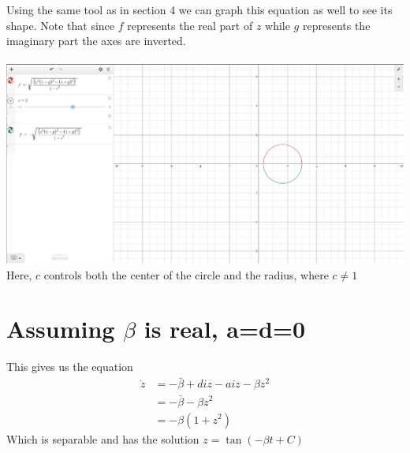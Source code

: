 \documentclass[10pt]{article}
\begin{document}
Using the same tool as in section 4 we can graph this equation as well to see its shape. Note that since $f$ represents the real part of $z$ while $g$ represents the imaginary part the axes are inverted.\\\\
\includegraphics[width=\textwidth]{Figure3}\\
Here, $c$ controls both the center of the circle and the radius, where $c\neq1$



\section{Assuming $\beta$ is real, a=d=0}
This gives us the equation
\begin{align*}
\dot z&=-\bar\beta+diz-aiz-\beta z^2\\
&=-\bar\beta-\beta z^2\\
&=-\beta(1+z^2)
\end{align*}
Which is separable and has the solution $z=\tan(-\beta t+C)$
\end{document}

